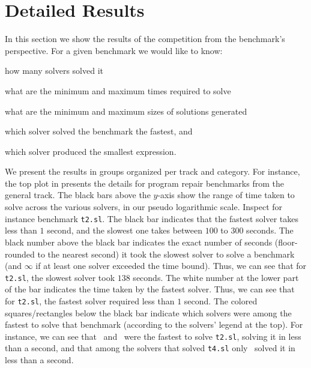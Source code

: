 \section{Detailed Results}
\label{sec:benchs-pres}

In this section we show the results of the competition from the benchmark's perspective.
For a given benchmark we would like to know:
\begin{inlist}
	\item how many solvers solved it
	\item what are the minimum and maximum times required to solve
	\item what are the minimum and maximum sizes of solutions generated
	\item which solver solved the benchmark the fastest, and
	\item which solver produced the smallest expression.
\end{inlist}

We present the results in groups organized per track and category.
For instance, the top plot in  presents the details for program repair benchmarks from the general track.
The black bars above the $y$-axis show the range of time taken to solve across the various solvers, in our pseudo logarithmic scale.
Inspect for instance benchmark \texttt{t2.sl}.
The black bar indicates that the fastest solver takes less than $1$ second, and the slowest one takes between $100$ to $300$ seconds.
The black number above the black bar indicates the exact number of seconds (floor-rounded to the nearest second)
it took the slowest solver to solve a benchmark (and $\infty$ if at least one solver exceeded the time bound).
Thus, we can see that for \texttt{t2.sl}, the slowest solver took $138$ seconds.
The white number at the lower part of the bar indicates the time taken by the fastest solver.
Thus, we can see that for \texttt{t2.sl}, the fastest solver required less than $1$ second.
The colored squares/rectangles below the black bar indicate which solvers were among the fastest to solve that benchmark
(according to the solvers' legend at the top).
For instance, we can see that \cvcnew\ and \eusolvernew\ were the fastest to solve \texttt{t2.sl},
solving it in less than a second, and that among the solvers that solved \texttt{t4.sl} only \eusolvernew\ solved it in less than a second.

